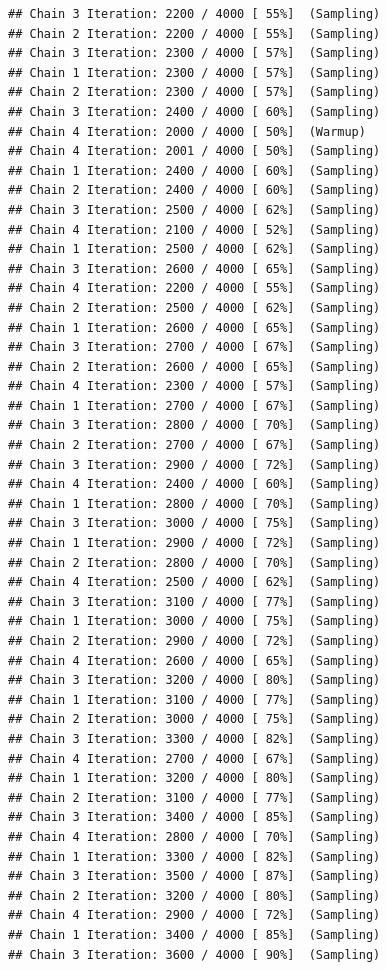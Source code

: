 \documentclass[
]{article}
\begin{document}
\begin{verbatim}
## Chain 3 Iteration: 2200 / 4000 [ 55%]  (Sampling) 
## Chain 2 Iteration: 2200 / 4000 [ 55%]  (Sampling) 
## Chain 3 Iteration: 2300 / 4000 [ 57%]  (Sampling) 
## Chain 1 Iteration: 2300 / 4000 [ 57%]  (Sampling) 
## Chain 2 Iteration: 2300 / 4000 [ 57%]  (Sampling) 
## Chain 3 Iteration: 2400 / 4000 [ 60%]  (Sampling) 
## Chain 4 Iteration: 2000 / 4000 [ 50%]  (Warmup) 
## Chain 4 Iteration: 2001 / 4000 [ 50%]  (Sampling) 
## Chain 1 Iteration: 2400 / 4000 [ 60%]  (Sampling) 
## Chain 2 Iteration: 2400 / 4000 [ 60%]  (Sampling) 
## Chain 3 Iteration: 2500 / 4000 [ 62%]  (Sampling) 
## Chain 4 Iteration: 2100 / 4000 [ 52%]  (Sampling) 
## Chain 1 Iteration: 2500 / 4000 [ 62%]  (Sampling) 
## Chain 3 Iteration: 2600 / 4000 [ 65%]  (Sampling) 
## Chain 4 Iteration: 2200 / 4000 [ 55%]  (Sampling) 
## Chain 2 Iteration: 2500 / 4000 [ 62%]  (Sampling) 
## Chain 1 Iteration: 2600 / 4000 [ 65%]  (Sampling) 
## Chain 3 Iteration: 2700 / 4000 [ 67%]  (Sampling) 
## Chain 2 Iteration: 2600 / 4000 [ 65%]  (Sampling) 
## Chain 4 Iteration: 2300 / 4000 [ 57%]  (Sampling) 
## Chain 1 Iteration: 2700 / 4000 [ 67%]  (Sampling) 
## Chain 3 Iteration: 2800 / 4000 [ 70%]  (Sampling) 
## Chain 2 Iteration: 2700 / 4000 [ 67%]  (Sampling) 
## Chain 3 Iteration: 2900 / 4000 [ 72%]  (Sampling) 
## Chain 4 Iteration: 2400 / 4000 [ 60%]  (Sampling) 
## Chain 1 Iteration: 2800 / 4000 [ 70%]  (Sampling) 
## Chain 3 Iteration: 3000 / 4000 [ 75%]  (Sampling) 
## Chain 1 Iteration: 2900 / 4000 [ 72%]  (Sampling) 
## Chain 2 Iteration: 2800 / 4000 [ 70%]  (Sampling) 
## Chain 4 Iteration: 2500 / 4000 [ 62%]  (Sampling) 
## Chain 3 Iteration: 3100 / 4000 [ 77%]  (Sampling) 
## Chain 1 Iteration: 3000 / 4000 [ 75%]  (Sampling) 
## Chain 2 Iteration: 2900 / 4000 [ 72%]  (Sampling) 
## Chain 4 Iteration: 2600 / 4000 [ 65%]  (Sampling) 
## Chain 3 Iteration: 3200 / 4000 [ 80%]  (Sampling) 
## Chain 1 Iteration: 3100 / 4000 [ 77%]  (Sampling) 
## Chain 2 Iteration: 3000 / 4000 [ 75%]  (Sampling) 
## Chain 3 Iteration: 3300 / 4000 [ 82%]  (Sampling) 
## Chain 4 Iteration: 2700 / 4000 [ 67%]  (Sampling) 
## Chain 1 Iteration: 3200 / 4000 [ 80%]  (Sampling) 
## Chain 2 Iteration: 3100 / 4000 [ 77%]  (Sampling) 
## Chain 3 Iteration: 3400 / 4000 [ 85%]  (Sampling) 
## Chain 4 Iteration: 2800 / 4000 [ 70%]  (Sampling) 
## Chain 1 Iteration: 3300 / 4000 [ 82%]  (Sampling) 
## Chain 3 Iteration: 3500 / 4000 [ 87%]  (Sampling) 
## Chain 2 Iteration: 3200 / 4000 [ 80%]  (Sampling) 
## Chain 4 Iteration: 2900 / 4000 [ 72%]  (Sampling) 
## Chain 1 Iteration: 3400 / 4000 [ 85%]  (Sampling) 
## Chain 3 Iteration: 3600 / 4000 [ 90%]  (Sampling) 

\end{verbatim}
\end{document}
